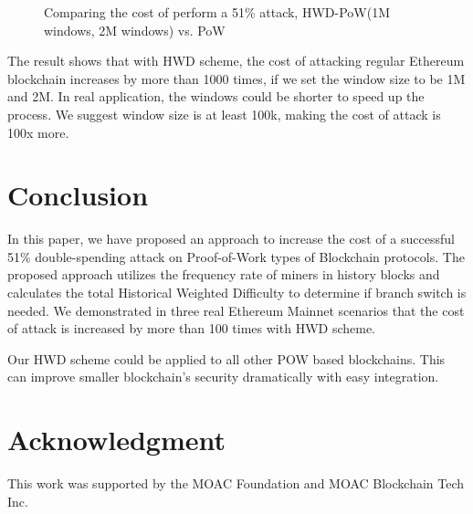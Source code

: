 \documentclass[conference]{IEEEtran}
\begin{document}
\begin{figure}[htbp]
\caption{Comparing the cost of perform a 51\% attack, HWD-PoW(1M windows, 2M windows) vs. PoW}
\label{fig3}
\end{figure}    

The result shows that with HWD scheme, the cost of attacking regular Ethereum blockchain increases by more than 1000 times, if we set the window size to be 1M and 2M. In real application, the windows could be shorter to speed up the process. We suggest window size is at least 100k, making the cost of attack is 100x more.


\section{Conclusion}
 
In this paper, we have proposed an approach to increase the cost of a successful 51\% double-spending attack on Proof-of-Work types of Blockchain protocols. The proposed approach utilizes the frequency rate of miners in history blocks and calculates the total Historical Weighted Difficulty to determine if branch switch is needed. We demonstrated in three real Ethereum Mainnet scenarios that the cost of attack is increased by more than 100 times with HWD scheme.

Our HWD scheme could be applied to all other POW based blockchains. This can improve smaller blockchain's security dramatically with easy integration. 

\section*{Acknowledgment}

This work was supported by the MOAC Foundation and MOAC Blockchain Tech Inc.
\end{document}
